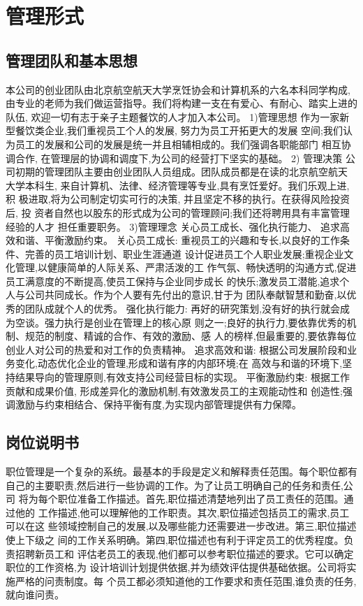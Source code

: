 \section{管理形式}
\subsection{管理团队和基本思想}
本公司的创业团队由北京航空航天大学烹饪协会和计算机系的六名本科同学构成,
由专业的老师为我们做运营指导。我们将构建一支在有爱心、有耐心、踏实上进的队伍,
欢迎一切有志于亲子主题餐饮的人才加入本公司。
1)管理思想
作为一家新型餐饮类企业,我们重视员工个人的发展, 努力为员工开拓更大的发展
空间;我们认为员工的发展和公司的发展是统一并且相辅相成的。我们强调各职能部门
相互协调合作, 在管理层的协调和调度下,为公司的经营打下坚实的基础。
2) 管理决策
公司初期的管理团队主要由创业团队人员组成。团队成员都是在读的北京航空航天
大学本科生, 来自计算机、法律、经济管理等专业,具有烹饪爱好。我们乐观上进,积
极进取,将为公司制定切实可行的决策, 并且坚定不移的执行。在获得风险投资后, 投
资者自然也以股东的形式成为公司的管理顾问;我们还将聘用具有丰富管理经验的人才
担任重要职务。
3)管理理念
关心员工成长、强化执行能力、
追求高效和谐、平衡激励约束。
关心员工成长:
重视员工的兴趣和专长,以良好的工作条件、完善的员工培训计划、职业生涯通道
设计促进员工个人职业发展;重视企业文化管理,以健康简单的人际关系、严肃活泼的工
作气氛、畅快透明的沟通方式,促进员工满意度的不断提高,使员工保持与企业同步成长
的快乐;激发员工潜能,追求个人与公司共同成长。作为个人要有先付出的意识,甘于为
团队奉献智慧和勤奋,以优秀的团队成就个人的优秀。
强化执行能力:
再好的研究策划,没有好的执行就会成为空谈。强力执行是创业在管理上的核心原
则之一;良好的执行力,要依靠优秀的机制、规范的制度、精诚的合作、有效的激励、感
人的榜样,但最重要的,要依靠每位创业人对公司的热爱和对工作的负责精神。
追求高效和谐:
根据公司发展阶段和业务变化,动态优化企业的管理,形成和谐有序的内部环境;在
高效与和谐的环境下,坚持结果导向的管理原则,有效支持公司经营目标的实现。
平衡激励约束:
根据工作贡献和成果价值, 形成差异化的激励机制,有效激发员工的主观能动性和
创造性;强调激励与约束相结合、保持平衡有度,为实现内部管理提供有力保障。
\subsection{岗位说明书}
职位管理是一个复杂的系统。最基本的手段是定义和解释责任范围。每个职位都有
自己的主要职责,然后进行一些协调的工作。为了让员工明确自己的任务和责任,公司
将为每个职位准备工作描述。首先,职位描述清楚地列出了员工责任的范围。通过他的
工作描述,他可以理解他的工作职责。其次,职位描述包括员工的需求,员工可以在这
些领域控制自己的发展,以及哪些能力还需要进一步改进。第三,职位描述使上下级之
间的工作关系明确。第四,职位描述也有利于评定员工的优秀程度。负责招聘新员工和
评估老员工的表现,他们都可以参考职位描述的要求。它可以确定职位的工作资格,为
设计培训计划提供依据,并为绩效评估提供基础依据。公司将实施严格的问责制度。每
个员工都必须知道他的工作要求和责任范围,谁负责的任务,就向谁问责。
